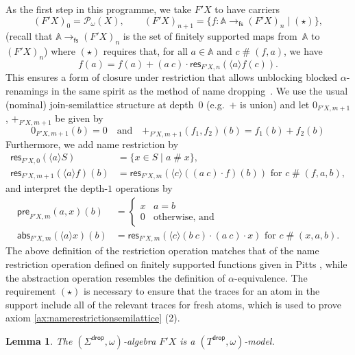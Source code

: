 \documentclass[11pt,a4paper]{amsart}
\newtheorem{lemma}[lemma]{Lemma}
\newcommand{\pre}{\mathsf{pre}}
\newcommand{\abs}{\mathsf{abs}}
\newcommand{\res}{\mathsf{res}}
\newcommand{\drop}{\mathsf{drop}}
\newcommand{\fs}{\mathsf{fs}}
\newcommand{\Names}{\mathbb{A}}
\newcommand{\pow}{\mathcal{P}}
\newcommand{\powf}{\pow_{\omega}}
\newcommand{\fresh}{\mathbin{\#}}
\newcommand{\bind}[1]{\langle #1\rangle}
\theoremstyle{plain}
\numberwithin{equation}{section}
\newcommand{\+}[1]{\mathcal{#1}\xspace}
\theoremstyle{definition}
\begin{document}
As the first step in this programme, we take $F'X$ to have carriers
\begin{equation*}
  (F' X)_0 = \powf(X), \qquad (F' X)_{n+1} = \{f \colon \Names \to_\fs (F' X)_n \mid (\star)\},
\end{equation*}
(recall that $\Names \to_\fs (F' X)_n$ is the set of finitely
supported maps from~$\Names$ to $(F'X)_n$) where $(\star)$ requires
that, for all $a \in \Names$ and $c \fresh (f,a)$, we have
\begin{equation}
  f(a) = f(a) + (a\ c) \cdot \res_{F' X, n}(\bind{a} f(c)). \label{eq:restriction}
\end{equation}
This ensures a form of closure under restriction that allows unblocking blocked $\alpha$-renamings in the same spirit as the method of name dropping~\cite{SchroderEA17}.
We use the usual (nominal) join-semilattice structure at depth~$0$ (e.g.~$+$ is union) and let $0_{F'X, m+1}$, $+_{F'X, m+1}$ be given by
\begin{equation*}
  0_{F'X, m+1}(b) = 0 \quad\text{and}\quad +_{F'X, m+1}(f_1, f_2)(b) = f_1(b) + f_2(b)
\end{equation*}
Furthermore, we add name restriction by
\begin{align*}
  \res_{F' X, 0}(\bind{a} S) &= \{x \in S \mid a \fresh x\}, \\
  \res_{F' X, m+1}(\bind{a} f)(b) &= \res_{F' X, m}(\bind{c} ((a\ c) \cdot f)(b)) \text{ for } c\fresh(f,a,b),
\end{align*}
and interpret the depth-$1$ operations by
\begin{align*}
  \pre_{F' X, m}(a, x)(b) & =
                            \begin{cases}
                              x & a = b\\
                              0 & \text{otherwise, and}
                            \end{cases}
  \\
  \abs_{F' X, m}(\bind{a} x)(b) & = \res_{F' X, m}(\bind{c} (b\ c) \cdot (a\ c) \cdot x) \text{ for } c\fresh(x,a,b).
\end{align*}
The above definition of the restriction operation matches that of the name restriction operation defined on finitely supported functions given in Pitts \cite{Pitts13}, while the abstraction operation resembles the definition of $\alpha$-equivalence.
The requirement $(\star)$ is necessary to ensure that the traces for an atom in the support include all of the relevant traces for fresh atoms, which is used to prove axiom \eqref{ax:namerestrictionsemilattice} (2).
\begin{lemma}\label{thm:semanticsmodelismodel}
  The $(\Sigma^\drop,\omega)$-algebra $F'X$ is a
  $(T^\drop,\omega)$-model.
\end{lemma}
\end{document}
